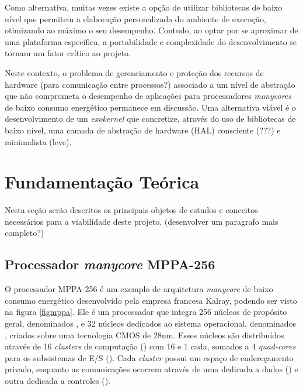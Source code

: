 \documentclass[
	12pt,				%
	openright,			%
	twoside,			%
	a4paper,			%
	english,			%
	brazil,				%
	]{abntex2}
\begin{document}
    Como alternativa, muitas vezes existe a opção de utilizar bibliotecas de baixo nível que permitem a elaboração personalizada do ambiente de execução, otimizando ao máximo o seu desempenho. Contudo, ao optar por se aproximar de uma plataforma específica, a portabilidade e complexidade do desenvolvimento se tornam um fator crítico ao projeto.
    
    Neste contexto, o problema de gerenciamento e proteção dos recursos de hardware (para comunicação entre processos?) associado a um nível de abstração que não comprometa o desempenho de aplicações para processadores \textit{manycores} de baixo consumo energético permanece em discussão.
    Uma alternativa viável é o desenvolvimento de um \textit{exokernel} que concretize, através do uso de bibliotecas de baixo nível, uma camada de abstração de hardware (HAL) consciente (???) e minimalista (leve).

\chapter{Fundamentação Teórica}
\label{sec:fundamentacao}

    Nesta seção serão descritos os principais objetos de estudos e conceitos necessários para a viabilidade deste projeto. (desenvolver um paragrafo mais completo?)

    \section{Processador \textit{manycore} MPPA-256}
    \label{sec:mppa}
    
        O processador MPPA-256 é um exemplo de arquitetura \textit{manycore} de baixo consumo energético \cite{Castro-IA3:2013} desenvolvido pela empresa francesa Kalray, podendo ser visto na figura \ref{figmppa}.
        Ele é um processador que integra 256 núcleos de propósito geral, denominados \pe, e 32 núcleos dedicados ao sistema operacional, denominados \rman, criados sobre uma tecnologia CMOS de 28nm.
        Esses núcleos são distribuídos através de 16 \textit{clusters} de computação (\cpclusters) com 16 \pe e 1 \rman cada, somados a 4 \textit{quad-cores} para os subsistemas de E/S (\ioclusters).
        Cada \textit{cluster} possui um espaço de endereçamento privado, enquanto as comunicações ocorrem através de uma \noc dedicada a dados (\dnoc) e outra dedicada a controles (\cnoc).
            
\end{document}
